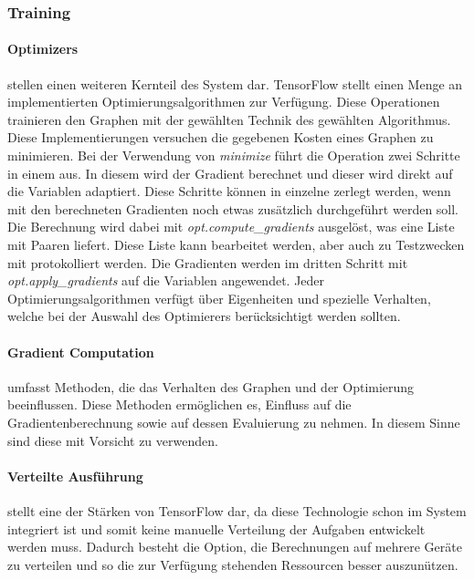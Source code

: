 \subsubsection{Training}

\paragraph{Optimizers} stellen einen weiteren Kernteil des System dar. 
TensorFlow stellt einen Menge an implementierten Optimierungsalgorithmen zur Verfügung. 
Diese Operationen trainieren den Graphen mit der gewählten Technik des gewählten Algorithmus. 
Diese Implementierungen versuchen die gegebenen Kosten eines Graphen zu minimieren. 
Bei der Verwendung von \textit{minimize} führt die Operation zwei Schritte in einem aus. 
In diesem wird der Gradient berechnet und dieser wird direkt auf die Variablen adaptiert. 
Diese Schritte können in einzelne zerlegt werden, wenn mit den berechneten Gradienten noch etwas zusätzlich durchgeführt werden soll. 
Die Berechnung wird dabei mit \textit{opt.compute\_gradients} ausgelöst, was eine Liste mit Paaren liefert. 
Diese Liste kann bearbeitet werden, aber auch zu Testzwecken mit protokolliert werden. 
Die Gradienten werden im dritten Schritt mit \textit{opt.apply\_gradients} auf die Variablen angewendet. 
Jeder Optimierungsalgorithmen verfügt über Eigenheiten und spezielle Verhalten, welche bei der Auswahl des Optimierers berücksichtigt werden sollten.

\paragraph{Gradient Computation} umfasst Methoden, die das Verhalten des Graphen und der Optimierung beeinflussen. 
Diese Methoden ermöglichen es, Einfluss auf die Gradientenberechnung sowie auf dessen Evaluierung zu nehmen. 
In diesem Sinne sind diese mit Vorsicht zu verwenden.

\paragraph{Verteilte Ausführung} stellt eine der Stärken von TensorFlow dar, da diese Technologie schon im System integriert ist und somit keine manuelle Verteilung der Aufgaben entwickelt werden muss. 
Dadurch besteht die Option, die Berechnungen auf mehrere Geräte zu verteilen und so die zur Verfügung stehenden Ressourcen besser auszunützen. \\

